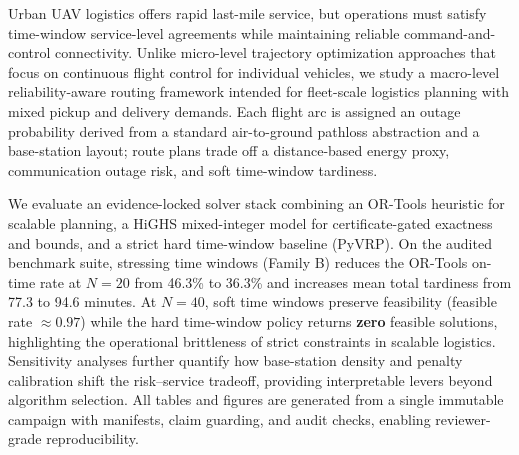 Urban UAV logistics offers rapid last-mile service, but operations must satisfy time-window service-level agreements while maintaining reliable command-and-control connectivity. Unlike micro-level trajectory optimization approaches that focus on continuous flight control for individual vehicles, we study a macro-level reliability-aware routing framework intended for fleet-scale logistics planning with mixed pickup and delivery demands. Each flight arc is assigned an outage probability derived from a standard air-to-ground pathloss abstraction and a base-station layout; route plans trade off a distance-based energy proxy, communication outage risk, and soft time-window tardiness.

We evaluate an evidence-locked solver stack combining an OR-Tools heuristic for scalable planning, a HiGHS mixed-integer model for certificate-gated exactness and bounds, and a strict hard time-window baseline (PyVRP). On the audited benchmark suite, stressing time windows (Family B) reduces the OR-Tools on-time rate at $N=20$ from 46.3\% to 36.3\% and increases mean total tardiness from 77.3 to 94.6 minutes. At $N=40$, soft time windows preserve feasibility (feasible rate $\approx 0.97$) while the hard time-window policy returns \textbf{zero} feasible solutions, highlighting the operational brittleness of strict constraints in scalable logistics. Sensitivity analyses further quantify how base-station density and penalty calibration shift the risk--service tradeoff, providing interpretable levers beyond algorithm selection. All tables and figures are generated from a single immutable campaign with manifests, claim guarding, and audit checks, enabling reviewer-grade reproducibility.
